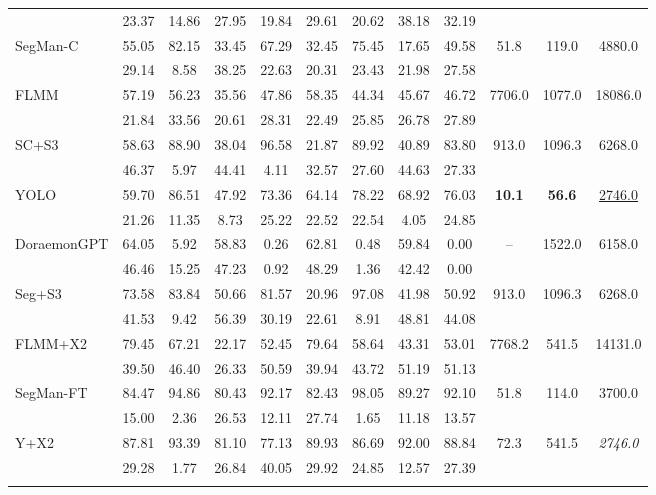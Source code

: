 \documentclass[preprint,12pt]{elsarticle}
\begin{document}
\begin{table}[!htbp]
\begin{tabular}{lccccccccccc}
  & 23.37 & 14.86 & 27.95 & 19.84 & 29.61 & 20.62 & 38.18 & 32.19 &  &  &  \\ \addlinespace[2pt]
SegMan-C & 55.05 & 82.15 & 33.45 & 67.29 & 32.45 & 75.45 & 17.65 & 49.58 & 51.8 & 119.0 & 4880.0 \\
  & 29.14 & 8.58 & 38.25 & 22.63 & 20.31 & 23.43 & 21.98 & 27.58 &  &  &  \\ \addlinespace[2pt]
\rowcolor{gray!12}
FLMM & 57.19 & 56.23 & 35.56 & 47.86 & 58.35 & 44.34 & 45.67 & 46.72 & 7706.0 & 1077.0 & 18086.0 \\
  & 21.84 & 33.56 & 20.61 & 28.31 & 22.49 & 25.85 & 26.78 & 27.89 &  &  &  \\ \addlinespace[2pt]
SC+S3 & 58.63 & 88.90 & 38.04 & 96.58 & 21.87 & 89.92 & 40.89 & 83.80 & 913.0 & 1096.3 & 6268.0 \\
  & 46.37 & 5.97 & 44.41 & 4.11 & 32.57 & 27.60 & 44.63 & 27.33 &  &  &  \\ \addlinespace[2pt]
\rowcolor{gray!12}
YOLO & 59.70 & 86.51 & 47.92 & 73.36 & 64.14 & 78.22 & 68.92 & 76.03 & \textbf{10.1} & \textbf{56.6} & \uline{2746.0} \\
  & 21.26 & 11.35 & 8.73 & 25.22 & 22.52 & 22.54 & 4.05 & 24.85 &  &  &  \\ \addlinespace[2pt]
DoraemonGPT & 64.05 & 5.92 & 58.83 & 0.26 & 62.81 & 0.48 & 59.84 & 0.00 & -- & 1522.0 & 6158.0 \\
  & 46.46 & 15.25 & 47.23 & 0.92 & 48.29 & 1.36 & 42.42 & 0.00 &  &  &  \\ \addlinespace[2pt]
\rowcolor{gray!12}
Seg+S3 & 73.58 & 83.84 & 50.66 & 81.57 & 20.96 & 97.08 & 41.98 & 50.92 & 913.0 & 1096.3 & 6268.0 \\
  & 41.53 & 9.42 & 56.39 & 30.19 & 22.61 & 8.91 & 48.81 & 44.08 &  &  &  \\ \addlinespace[2pt]
FLMM+X2 & 79.45 & 67.21 & 22.17 & 52.45 & 79.64 & 58.64 & 43.31 & 53.01 & 7768.2 & 541.5 & 14131.0 \\
  & 39.50 & 46.40 & 26.33 & 50.59 & 39.94 & 43.72 & 51.19 & 51.13 &  &  &  \\ \addlinespace[2pt]
\rowcolor{gray!12}
SegMan-FT & 84.47 & 94.86 & 80.43 & 92.17 & 82.43 & 98.05 & 89.27 & 92.10 & 51.8 & 114.0 & 3700.0 \\
  & 15.00 & 2.36 & 26.53 & 12.11 & 27.74 & 1.65 & 11.18 & 13.57 &  &  &  \\ \addlinespace[2pt]
Y+X2 & 87.81 & 93.39 & 81.10 & 77.13 & 89.93 & 86.69 & 92.00 & 88.84 & 72.3 & 541.5 & \textit{2746.0} \\
  & 29.28 & 1.77 & 26.84 & 40.05 & 29.92 & 24.85 & 12.57 & 27.39 &  &  &  \\ \addlinespace[2pt]

\end{tabular}
\end{table}
\end{document}
